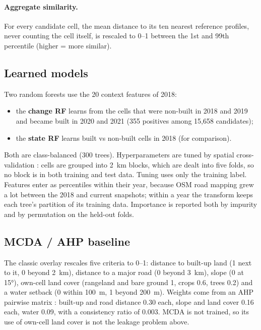 \paragraph{Aggregate similarity.} For every candidate cell, the mean distance to its ten nearest
reference profiles, never counting the cell itself, is rescaled to 0--1 between the 1st and
99th percentile (higher = more similar).

\subsection{Learned models}

Two random forests \citep{breiman2001} use the 20 context features of 2018:
\begin{itemize}
  \item the \textbf{change RF} learns from the cells that were non-built in 2018 and 2019 and
        became built in 2020 and 2021 (355 positives among 15{,}658 candidates);
  \item the \textbf{state RF} learns built vs non-built cells in 2018 (for comparison).
\end{itemize}
Both are class-balanced (300 trees). Hyperparameters are tuned by spatial cross-validation
\citep{roberts2017, valavi2019}: cells are grouped into \SI{2}{\km} blocks, which are dealt into
five folds, so no block is in both training and test data. Tuning uses only the training label.
Features enter as percentiles within their year, because OSM road mapping grew a lot between
the 2018 and current snapshots; within a year the transform keeps each tree's partition of its
training data. Importance is reported both by impurity and by permutation on the held-out folds.

\subsection{MCDA / AHP baseline}

The classic overlay rescales five criteria to 0--1: distance to built-up land (1 next to it, 0
beyond \SI{2}{\km}), distance to a major road (0 beyond \SI{3}{\km}), slope (0 at \ang{15}),
own-cell land cover (rangeland and bare ground 1, crops 0.6, trees 0.2) and a water setback (0
within \SI{100}{\m}, 1 beyond \SI{200}{\m}). Weights come from an AHP pairwise matrix
\citep{saaty1980}: built-up and road distance 0.30 each, slope and land cover 0.16 each, water
0.09, with a consistency ratio of 0.003. MCDA is not trained, so its use of own-cell land cover
is not the leakage problem above.

